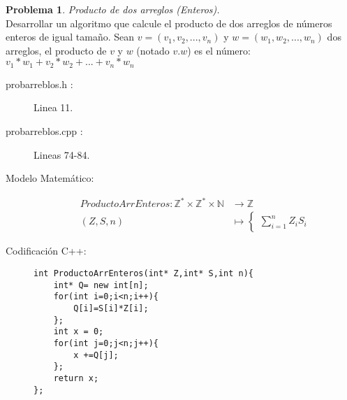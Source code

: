 \documentclass{article}
\theoremstyle{plain}
\theoremstyle{definition}
\newtheorem{problem}{Problema}
\begin{document}
\begin{problem} \emph{Producto de dos arreglos (Enteros).}\\
\hspace*{7mm}Desarrollar un algoritmo que calcule el producto de dos arreglos de números enteros de igual tamaño. Sean $v=(v_1,v_2,..., v_n)$ y $w=(w_1,w_2,..., w_n)$ dos arreglos, el producto de $v$ y $w$ (notado $v.w$) es el número: $v_1 * w_1 + v_2*w_2 +...+ v_n * w_n$
\begin{description}
\item[probarreblos.h :] Linea 11. \item[probarreblos.cpp :] Lineas 74-84.

\item[Modelo Matemático:]
\begin{align*}
ProductoArrEnteros: \mathbb{Z}^{*}\times\mathbb{Z}^{*}\times\mathbb{N} &\to \mathbb{Z}\\
(Z,S,n) &\mapsto
\begin{cases}
\sum_{i=1}^n Z_iS_i
\end{cases}
\end{align*}
%
\item[Codificación \textsf{C++}:]\hfill
%
\begin{verbatim}
int ProductoArrEnteros(int* Z,int* S,int n){
    int* Q= new int[n];
    for(int i=0;i<n;i++){
        Q[i]=S[i]*Z[i];
    };
    int x = 0;
    for(int j=0;j<n;j++){
        x +=Q[j];
    };
    return x;
};
\end{verbatim}
\end{description}
\end{problem}
\end{document}
